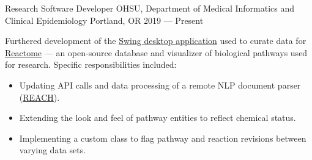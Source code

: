 \showoff
{Research Software Developer}
{OHSU, Department of Medical Informatics and Clinical Epidemiology}
{Portland, OR}
{2019 --- Present}

Furthered development of the {\textcolor{my-blue}{\href{https://github.com/reactome/CuratorTool}{Swing desktop application}}} used to curate data for {\textcolor{my-blue}{\href{https://reactome.org/}{Reactome}}} --- an open-source database and visualizer of biological pathways used for research. Specific responsibilities included:

\begin{itemize}[label=$\triangleright$]
    \item Updating API calls and data processing of a remote NLP document parser (\textcolor{my-blue}{\href{https://github.com/clulab/reach}{REACH}}).
    \item Extending the look and feel of pathway entities to reflect chemical status.
    \item Implementing a custom class to flag pathway and reaction revisions between varying data sets.
\end{itemize}

